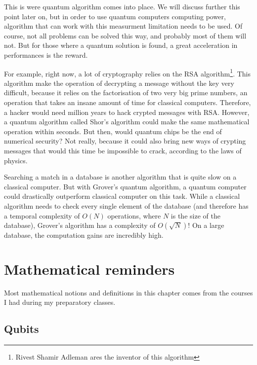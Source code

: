 \documentclass[a4paper,12pt]{report}
\newcommand{\icite}[1]{\up{\textit{\cite{#1}}}}
\newcommand{\para}[1]{\par{#1}\\}
\begin{document}
\para{
    This is were quantum algorithm comes into place. We will discuss further this point later on, but in order to use quantum computers computing power, algorithm that can work with this measurment limitation needs to be used. Of course, not all problems can be solved this way, and probably most of them will not. But for those where a quantum solution is found, a great acceleration in performances is the reward.
}

\para{
    For example, right now, a lot of cryptography relies on the RSA algorithm\footnote{Rivest Shamir Adleman ares the inventor of this algorithm}. This algorithm make the operation of decrypting a message without the key very difficult, because it relies on the factorisation of two very big prime numbers, an operation that takes an insane amount of time for classical computers. Therefore, a hacker would need million years to hack crypted messages with RSA. However, a quantum algorithm called Shor's algorithm could make the same mathematical operation within seconds. But then, would quantum chips be the end of numerical security? Not really, because it could also bring new ways of crypting messages that would this time be impossible to crack, according to the laws of physics.
}

\para{
    Searching a match in a database is another algorithm that is quite slow on a classical computer. But with Grover's quantum algorithm, a quantum computer could drastically outperform classical computer on this task. While a classical algorithm needs to check every single element of the database (and therefore has a temporal complexity of $O(N)$ operations, where $N$ is the size of the database), Grover's algorithm has a complexity of $O(\sqrt{N})$! On a large database, the computation gains are incredibly high.
}

%
%

\chapter{Mathematical reminders} \label{Maths}

Most mathematical notions and definitions in this chapter comes from the courses I had during my preparatory classes\icite{ref1}.

    \section{Qubits}
\end{document}
